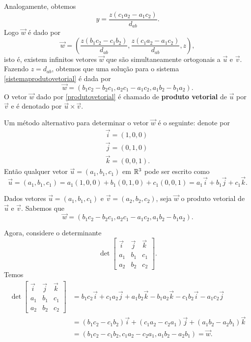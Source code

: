 Analogamente, obtemos
\[
    y = \dfrac{z(c_1a_2 - a_1c_2)}{d_{ab}}.
\]
Logo $\vec{w}$ é dado por
\[
    \vec{w} = \left(\dfrac{z(b_1c_2 - c_1b_2)}{d_{ab}}, \dfrac{z(c_1a_2 - a_1c_2)}{d_{ab}}, z\right),
\]
isto é, existem infinitos vetores $\vec{w}$ que são simultaneamente ortogonais a $\vec{u}$ e $\vec{v}$. Fazendo $z = d_{ab}$, obtemos que uma solução para o sistema \eqref{sistemaprodutovetorial} é dada por
\begin{equation}\label{produtovetorial}
    \vec{w} = (b_1c_2 - b_2c_1, a_2c_1 - a_1c_2, a_1b_2 - b_1a_2).
\end{equation}
O vetor $\vec{w}$ dado por \eqref{produtovetorial} é chamado de \textbf{produto vetorial} de $\vec{u}$ por $\vec{v}$ e é denotado por $\vec{u}\times\vec{v}$.

Um método alternativo para determinar o vetor $\vec{w}$ é o seguinte: denote por
\begin{align*}
    \vec{i} = (1,0,0) \\
    \vec{j} = (0,1,0) \\
    \vec{k} = (0,0,1).
\end{align*}
Então qualquer vetor $\vec{u} = (a_1,b_1,c_1)$ em $\mathbb{R}^3$ pode ser escrito como
\[
    \vec{u} = (a_1,b_1,c_1) = a_1(1,0,0) + b_1(0,1,0) + c_1(0,0,1) = a_1\vec{i} + b_1\vec{j} + c_1\vec{k}.
\]

Dados vetores $\vec{u} = (a_1,b_1,c_1)$ e $\vec{v} = (a_2,b_2,c_2)$, seja $\vec{w}$ o produto vetorial de $\vec{u}$ e $\vec{v}$. Sabemos que
\[
    \vec{w} = (b_1c_2 - b_2c_1, a_2c_1 - a_1c_2, a_1b_2 - b_1a_2).
\]

Agora, considere o determinante
\[
    \det \begin{bmatrix}
        \vec{i} & \vec{j} & \vec{k} \\
        a_1     & b_1     & c_1     \\
        a_2     & b_2     & c_2
    \end{bmatrix}.
\]
Temos
\begin{align*}
    \det \begin{bmatrix}
             \vec{i} & \vec{j} & \vec{k} \\
             a_1     & b_1     & c_1     \\
             a_2     & b_2     & c_2
         \end{bmatrix} & = b_1c_2\vec{i} + c_1a_2\vec{j} + a_1b_2\vec{k} - b_1a_2\vec{k} - c_1b_2\vec{i} - a_1c_2\vec{j} \\ &= (b_1c_2 - c_1b_2)\vec{i} + (c_1a_2 - c_2a_1)\vec{j} + (a_1b_2 - a_2b_1)\vec{k} \\ &= (b_1c_2 - c_1b_2, c_1a_2 - c_2a_1, a_1b_2 - a_2b_1) = \vec{w}.
\end{align*}

